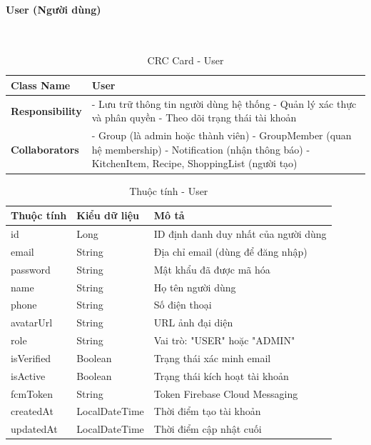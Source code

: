 \paragraph{User (Người dùng)} ~\\

\begin{table}[H]
\small
\renewcommand{\arraystretch}{1.3}
\begin{tabularx}{\textwidth}{|>{\raggedright\arraybackslash}p{3.5cm}|X|}
\hline
\rowcolor{gray!20}
\textbf{Class Name} & User \\
\hline
\textbf{Responsibility} & - Lưu trữ thông tin người dùng hệ thống \newline - Quản lý xác thực và phân quyền \newline - Theo dõi trạng thái tài khoản \\
\hline
\textbf{Collaborators} & - Group (là admin hoặc thành viên) \newline - GroupMember (quan hệ membership) \newline - Notification (nhận thông báo) \newline - KitchenItem, Recipe, ShoppingList (người tạo) \\
\hline
\end{tabularx}
\caption{CRC Card - User}
\end{table}

\begin{table}[H]
\small
\renewcommand{\arraystretch}{1.3}
\begin{tabularx}{\textwidth}{|>{\raggedright\arraybackslash}p{3cm}|>{\raggedright\arraybackslash}p{3cm}|X|}
\hline
\rowcolor{gray!20}
\textbf{Thuộc tính} & \textbf{Kiểu dữ liệu} & \textbf{Mô tả} \\
\hline
id & Long & ID định danh duy nhất của người dùng \\
\hline
email & String & Địa chỉ email (dùng để đăng nhập) \\
\hline
password & String & Mật khẩu đã được mã hóa \\
\hline
name & String & Họ tên người dùng \\
\hline
phone & String & Số điện thoại \\
\hline
avatarUrl & String & URL ảnh đại diện \\
\hline
role & String & Vai trò: "USER" hoặc "ADMIN" \\
\hline
isVerified & Boolean & Trạng thái xác minh email \\
\hline
isActive & Boolean & Trạng thái kích hoạt tài khoản \\
\hline
fcmToken & String & Token Firebase Cloud Messaging \\
\hline
createdAt & LocalDateTime & Thời điểm tạo tài khoản \\
\hline
updatedAt & LocalDateTime & Thời điểm cập nhật cuối \\
\hline
\end{tabularx}
\caption{Thuộc tính - User}
\end{table}

